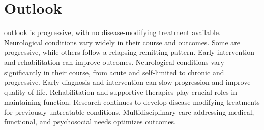 \section{Outlook}
outlook is progressive, with no disease-modifying treatment available. Neurological conditions vary widely in their course and outcomes. Some are progressive, while others follow a relapsing-remitting pattern. Early intervention and rehabilitation can improve outcomes. Neurological conditions vary significantly in their course, from acute and self-limited to chronic and progressive. Early diagnosis and intervention can slow progression and improve quality of life. Rehabilitation and supportive therapies play crucial roles in maintaining function. Research continues to develop disease-modifying treatments for previously untreatable conditions. Multidisciplinary care addressing medical, functional, and psychosocial needs optimizes outcomes.
